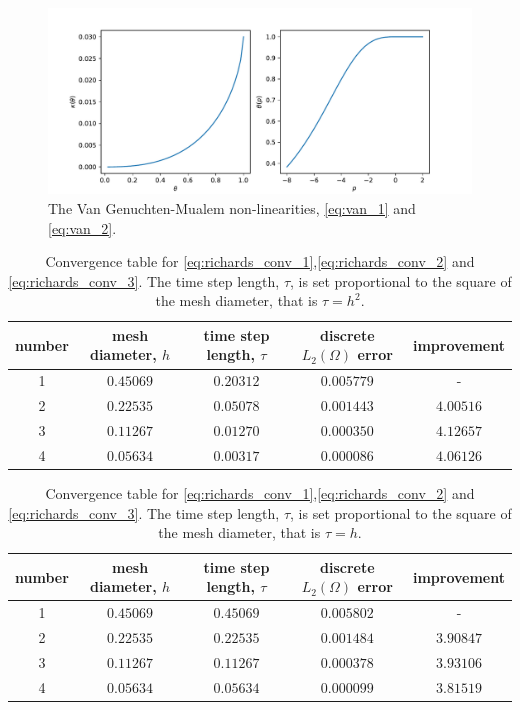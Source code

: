 \documentclass[../Main/main.tex]{subfiles}
\begin{document}
		\begin{figure}
		\centering
		\includegraphics[width=1.1\textwidth]{van.pdf}
		\caption{The Van Genuchten-Mualem non-linearities, \eqref{eq:van_1} and \eqref{eq:van_2}.}
	\end{figure}
	\begin{table}[H]
		\centering
		\begin{tabular}{|c c c c c|}
			\hline
			number & mesh diameter, $h$ & time step length, $\tau$ & discrete $L_2(\Omega)$ error & improvement \\
			\hline
				1&$0.45069$&$0.20312$&$0.005779$&-\\ 
				2&$0.22535$&$0.05078$&$0.001443$&$4.00516$\\
				3&$0.11267$&$0.01270$&$0.000350$&$4.12657$\\
				4&$0.05634$&$0.00317$&$0.000086$&$4.06126$\\
			\hline
		\end{tabular}
		\caption{Convergence table for \eqref{eq:richards_conv_1},\eqref{eq:richards_conv_2} and \eqref{eq:richards_conv_3}. The time step length, $\tau$, is set proportional to the square of the mesh diameter, that is $\tau=h^2$.}
		\label{tab:rihcards_nonlinear1}
	\end{table}
	\begin{table}[H]
		\centering
		\begin{tabular}{|c c c c c|}
			\hline
			number & mesh diameter, $h$ & time step length, $\tau$ & discrete $L_2(\Omega)$ error & improvement \\
			\hline
				1&$0.45069$&$0.45069$&$0.005802$&-\\ 
				2&$0.22535$&$0.22535$&$0.001484$&$3.90847$\\
				3&$0.11267$&$0.11267$&$0.000378$&$3.93106$\\
				4&$0.05634$&$0.05634$&$0.000099$&$3.81519$\\
			\hline
		\end{tabular}
		\caption{Convergence table for \eqref{eq:richards_conv_1},\eqref{eq:richards_conv_2} and \eqref{eq:richards_conv_3}. The time step length, $\tau$, is set proportional to the square of the mesh diameter, that is $\tau=h$.}
		\label{tab:rihcards_nonlinear2}
	\end{table}
\end{document}
